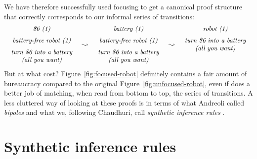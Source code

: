 We have therefore successfully used focusing to get a canonical
proof structure that correctly corresponds to our 
informal series of transitions:
\[
\begin{array}{ccccc}
\begin{array}{c}
\mbox{\it \$6 (1)}\medskip\\ 
\mbox{\it battery-free robot (1)} \medskip\\ 
\mbox{\it turn \$6 into a battery}\\
\mbox{\it (all you want)}
\end{array}
& \leadsto &
\begin{array}{c}
\mbox{\it battery  (1)}\medskip\\ 
\mbox{\it battery-free robot (1)} \medskip\\ 
\mbox{\it turn \$6 into a battery}\\
\mbox{\it (all you want)}
\end{array}
& \leadsto &
\begin{array}{c}
\mbox{\it robot (1)} \medskip\\ 
\mbox{\it turn \$6 into a battery}\\
\mbox{\it (all you want)}\medskip\\~\\
\end{array}
\end{array}
\]
But at what cost? Figure~\ref{fig:focused-robot} definitely contains a
fair amount of bureaucracy compared to the original
Figure~\ref{fig:unfocused-robot}, even if does a better job of
matching, when read from bottom to top, the series of transitions. A
less cluttered way of looking at these proofs is in terms of what
Andreoli called {\it bipoles} \cite{andreoli01focussing} and what we,
following Chaudhuri, call {\it synthetic inference rules}
\cite{chaudhuri08focusing}.

\section{Synthetic inference rules}
\label{sec:linsynthetic}

